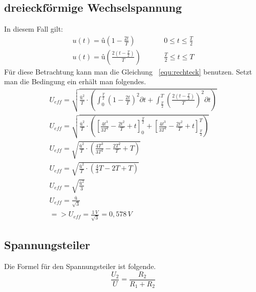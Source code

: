         \subsection{dreieckförmige Wechselspannung}   
       
            In diesem Fall gilt:
            \begin{align}
                u(t)=û\left(1-\frac{2t}{T}\right)  &\hspace{1cm}0 \leq t \leq \frac{T}{2}\\
                u(t)=û\left(\frac{2(t-\frac{T}{2})}{T}\right) &\hspace{1cm} \frac{T}{2} \leq t \leq T
            \end{align}
            Für diese Betrachtung kann man die Gleichung ~\ref{equ:rechteck} benutzen. Setzt man die Bedingung ein erhält man folgendes.
            \begin{gather}
                U_{eff}=\sqrt{\frac{û^2}{T}\cdot\left(\int_{0}^{\frac{T}{2}} \left(1-\frac{2t}{T}\right)^2\partial t + \int_{\frac{T}{2}}^{T} \left(\frac{2(t-\frac{T}{2})}{T}\right)^2\partial t\right)}    \\
                U_{eff}=\sqrt{\frac{û^2}{T}\cdot\left(\left[\frac{4t^3}{3T^2}-\frac{2t^2}{T}+t\right]_{0}^{\frac{T}{2}} + \left[\frac{4t^3}{3T^2}-\frac{2t^2}{T}+t\right]_{\frac{T}{2}}^{T}\right)}\\
                U_{eff}=\sqrt{\frac{û^2}{T}\cdot\left(\frac{4T^3}{3T^2}-\frac{2T^2}{T}+T \right)}\\
                U_{eff}=\sqrt{\frac{û^2}{T}\cdot\left(\frac{4}{3}T-{2T}+T \right)}\\
                U_{eff}=\sqrt{\frac{û^2}{3}}\\
                U_{eff}=\frac{û}{\sqrt{3}}\\
                => U_{eff}=\frac{1\,V}{\sqrt{3}}= 0,578\,V
            \end{gather}
        \subsection{Spannungsteiler}
            Die Formel für den Spannungsteiler ist folgende.
            \begin{equation}
                \frac{U_2}{U}= \frac{R_2}{R_1+R_2}
            \end{equation}

        


            